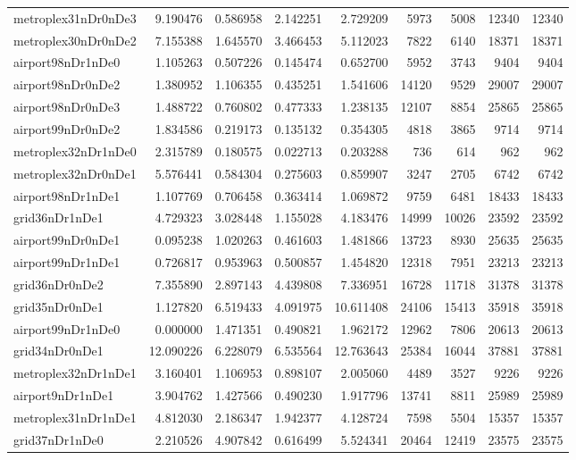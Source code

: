 \begin{longtable}{|l|r|r|r|r|r|r|r|r|}
metroplex31nDr0nDe3 & 9.190476 & 0.586958 & 2.142251 & 2.729209 & 5973 & 5008 & 12340 & 12340 \\
metroplex30nDr0nDe2 & 7.155388 & 1.645570 & 3.466453 & 5.112023 & 7822 & 6140 & 18371 & 18371 \\
airport98nDr1nDe0 & 1.105263 & 0.507226 & 0.145474 & 0.652700 & 5952 & 3743 & 9404 & 9404 \\
airport98nDr0nDe2 & 1.380952 & 1.106355 & 0.435251 & 1.541606 & 14120 & 9529 & 29007 & 29007 \\
airport98nDr0nDe3 & 1.488722 & 0.760802 & 0.477333 & 1.238135 & 12107 & 8854 & 25865 & 25865 \\
airport99nDr0nDe2 & 1.834586 & 0.219173 & 0.135132 & 0.354305 & 4818 & 3865 & 9714 & 9714 \\
metroplex32nDr1nDe0 & 2.315789 & 0.180575 & 0.022713 & 0.203288 & 736 & 614 & 962 & 962 \\
metroplex32nDr0nDe1 & 5.576441 & 0.584304 & 0.275603 & 0.859907 & 3247 & 2705 & 6742 & 6742 \\
airport98nDr1nDe1 & 1.107769 & 0.706458 & 0.363414 & 1.069872 & 9759 & 6481 & 18433 & 18433 \\
grid36nDr1nDe1 & 4.729323 & 3.028448 & 1.155028 & 4.183476 & 14999 & 10026 & 23592 & 23592 \\
airport99nDr0nDe1 & 0.095238 & 1.020263 & 0.461603 & 1.481866 & 13723 & 8930 & 25635 & 25635 \\
airport99nDr1nDe1 & 0.726817 & 0.953963 & 0.500857 & 1.454820 & 12318 & 7951 & 23213 & 23213 \\
grid36nDr0nDe2 & 7.355890 & 2.897143 & 4.439808 & 7.336951 & 16728 & 11718 & 31378 & 31378 \\
grid35nDr0nDe1 & 1.127820 & 6.519433 & 4.091975 & 10.611408 & 24106 & 15413 & 35918 & 35918 \\
airport99nDr1nDe0 & 0.000000 & 1.471351 & 0.490821 & 1.962172 & 12962 & 7806 & 20613 & 20613 \\
grid34nDr0nDe1 & 12.090226 & 6.228079 & 6.535564 & 12.763643 & 25384 & 16044 & 37881 & 37881 \\
metroplex32nDr1nDe1 & 3.160401 & 1.106953 & 0.898107 & 2.005060 & 4489 & 3527 & 9226 & 9226 \\
airport9nDr1nDe1 & 3.904762 & 1.427566 & 0.490230 & 1.917796 & 13741 & 8811 & 25989 & 25989 \\
metroplex31nDr1nDe1 & 4.812030 & 2.186347 & 1.942377 & 4.128724 & 7598 & 5504 & 15357 & 15357 \\
grid37nDr1nDe0 & 2.210526 & 4.907842 & 0.616499 & 5.524341 & 20464 & 12419 & 23575 & 23575 \\

\end{longtable}
